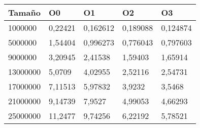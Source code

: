 \begin{tabular}{|l|l|l|l|l|}
	\hline
	Tamaño & O0 & O1 & O2 & O3 \\
	\hline
	\hline
	1000000 & 0,22421 & 0,162612 & 0,189088 & 0,124874 \\
	\hline
	5000000 & 1,54404 & 0,996273 & 0,776043 & 0,797603 \\
	\hline
	9000000 & 3,20945 & 2,41538 & 1,59403 & 1,65914 \\
	\hline
	13000000 & 5,0709 & 4,02955 & 2,52116 & 2,54731 \\
	\hline
	17000000 & 7,11513 & 5,97832 & 3,9232 & 3,5468 \\
	\hline
	21000000 & 9,14739 & 7,9527 & 4,99053 & 4,66293 \\
	\hline
	25000000 & 11,2477 & 9,74256 & 6,22192 & 5,78521 \\
	\hline
\end{tabular}
